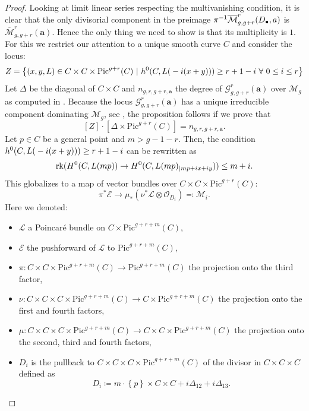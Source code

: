 \documentclass{article}
\theoremstyle{plain}
\theoremstyle{definition}
\def\OO{\mathcal{O}}
\def\mm{\overline{\mathcal{M}}}
\begin{document}
\begin{proof} Looking at limit linear series respecting the multivanishing condition, it is clear that the only divisorial component in the preimage $\pi^{-1}\mm^r_{g, g+r}\text{\large (}D_{\bullet}, \textbf{a}\text{\large )}$ is $\mm^r_{g,g+r}(\textbf{a})$. Hence the only thing we need to show is that its multiplicity is $1$. For this we restrict our attention to a unique smooth curve $C$ and consider the locus: 
	\[ Z = \left\{(x,y,L)\in C\times C\times \mathrm{Pic}^{g+r}(C) \ | \ h^0\text{\Large(}C, L\text{\large(}-i(x+y)\text{\large)}\text{\Large)}\geq r+1-i \ \forall \ 0\leq i \leq r\right\} \]
Let $\Delta$ be the diagonal of $C\times C$ and $n_{g,r,g+r, \textbf{a}}$ the degree of $\mathcal{G}^r_{g,g+r}(\textbf{a})$ over $\mathcal{M}_g$ as computed in \cite{FarkasCastel}. Because the locus $\mathcal{G}^r_{g,g+r}(\textbf{a})$ has a unique irreducible component dominating $\mathcal{M}_g$, see \cite[Theorem 1.2]{IrreducibilityBN}, the proposition follows if we prove that 
\[ [Z]\cdot [\Delta\times \mathrm{Pic}^{g+r}(C)] = n_{g,r,g+r, \textbf{a}}. \]
Let $p \in C$ be a general point and $m > g-1-r$. Then, the condition $h^0\text{\Large(}C, L\text{\large(}-i(x+y)\text{\large)}\text{\Large)} \geq r+1-i$ can be rewritten as 
\[ \mathrm{rk}\text{\Large (}H^0\text{\large(}C, L(mp)\text{\large)} \rightarrow H^0\text{\large(}C, L(mp)_{|mp+ix+iy}\text{\large)}\text{\Large )} \leq m+i. \]
This globalizes to a map of vector bundles over $C\times C\times \mathrm{Pic}^{g+r}(C)$:
\[ \pi^*\mathcal{E} \rightarrow \mu_*(\nu^*\mathcal{L}\otimes \OO_{D_i})\eqqcolon \mathcal{M}_i.\] 
Here we denoted: 
\begin{itemize}
	\item $\mathcal{L}$ a Poincar\'e bundle on $C\times \mathrm{Pic}^{g+r+m}(C)$, 
	\item $\mathcal{E}$ the pushforward of $\mathcal{L}$ to $\mathrm{Pic}^{g+r+m}(C)$, 
	\item $ \pi\colon C\times C \times \mathrm{Pic}^{g+r+m}(C) \rightarrow \mathrm{Pic}^{g+r+m}(C)$ the projection onto the third factor, 
	\item $\nu \colon C\times C\times C \times \mathrm{Pic}^{g+r+m}(C) \rightarrow C\times \mathrm{Pic}^{g+r+m}(C)$ the projection onto the first and fourth factors, 
	\item $\mu\colon C\times C\times C \times \mathrm{Pic}^{g+r+m}(C) \rightarrow C\times C \times \mathrm{Pic}^{g+r+m}(C)$ the projection onto the second, third and fourth factors,
	\item $D_i$ is the pullback to $C\times C\times C \times \mathrm{Pic}^{g+r+m}(C)$ of the divisor in $C\times C\times C$ defined as
	\[ D_i \coloneqq m\cdot \left\{p\right\}\times C\times C + i\Delta_{12} + i\Delta_{13}.\]
\end{itemize}


\end{proof}
\end{document}
